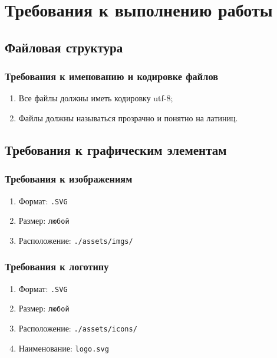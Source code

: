 \section{Требования к выполнению работы}

\subsection{Файловая структура}

\subsubsection{Требования к именованию и кодировке файлов }
\begin{enumerate}
  \item Все файлы должны иметь кодировку utf-8;
  \item Файлы должны называться прозрачно и понятно на латиниц.
\end{enumerate}

\subsection{Требования к графическим элементам}
\subsubsection{Требования к изображениям}
\begin{enumerate}
  \item Формат: \texttt{.SVG}
  \item Размер: \texttt{любой}
  \item Расположение: \texttt{./assets/imgs/}
\end{enumerate}

\subsubsection{Требования к логотипу}
\begin{enumerate}
  \item Формат: \texttt{.SVG}
  \item Размер: \texttt{любой}
  \item Расположение: \texttt{./assets/icons/}
  \item Наименование: \texttt{logo.svg}
\end{enumerate}

